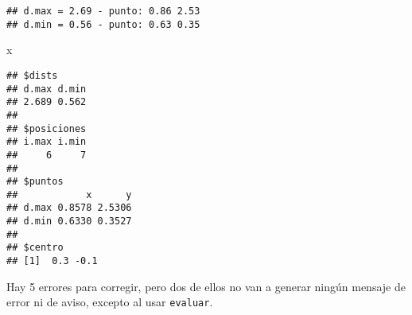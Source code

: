\documentclass[]{article}
\newenvironment{Shaded}{}{}
\newcommand{\NormalTok}[1]{{#1}}
\begin{document}
\begin{verbatim}
## d.max = 2.69 - punto: 0.86 2.53 
## d.min = 0.56 - punto: 0.63 0.35
\end{verbatim}
\begin{Shaded}
\begin{Highlighting}[]
\NormalTok{x}
\end{Highlighting}
\end{Shaded}
\begin{verbatim}
## $dists
## d.max d.min 
## 2.689 0.562 
## 
## $posiciones
## i.max i.min 
##     6     7 
## 
## $puntos
##            x      y
## d.max 0.8578 2.5306
## d.min 0.6330 0.3527
## 
## $centro
## [1]  0.3 -0.1
\end{verbatim}
Hay 5 errores para corregir, pero dos de ellos no van a generar ningún
mensaje de error ni de aviso, excepto al usar \texttt{evaluar}.
\end{document}

